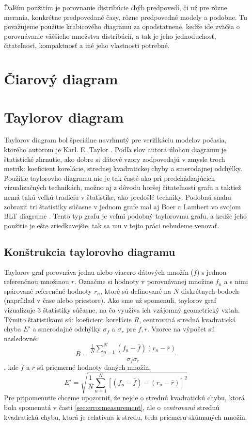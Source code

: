 Ďalším použitím je porovnanie distribúcie chýb predpovedí, či už pre rôzne merania, konkrétne predpovedané časy, rôzne predpovedné modely a podobne. Tu považujeme použitie krabicového diagramu za opodstatnené, keďže ide zväčša o porovnávanie väčšieho množstva distribúcií, a tak je jeho jednoduchosť, čitateľnosť, kompaktnosť a iné jeho vlastnosti potrebné.

\section{Čiarový diagram}

\section{Taylorov diagram}
Taylorov diagram bol špeciálne navrhnutý pre verifikáciu modelov počasia, ktorého autorom je Karl. E. Taylor \cite{Taylor}. Podľa slov autora úlohou diagramu je štatistické zhrnutie, ako dobre si dátové vzory zodpovedajú v zmysle troch metrík: koeficient korelácie, strednej kvadratickej chyby a smerodajnej odchýlky. Použitie taylorovho diagramu nie je tak časté ako pri predchádzajúcich vizualizačných technikách, možno aj z dôvodu horšej čitateľnosti grafu a taktiež nemá takú veľkú tradíciu v štatistike, ako predošlé techniky. Podobnú snahu zobraziť tri štatistiky súčasne v jednom grafe mal aj Boer a Lambert vo svojom BLT diagrame \cite{Boer}. Tento typ grafu je veľmi podobný taylorovmu grafu, a keďže jeho použitie je ešte zriedkavejšie, tak sa mu v tejto práci nebudeme venovať.
  
\subsection{Konštrukcia taylorovho diagramu}
Taylorov graf porovnáva jednu alebo viacero dátových množín ($ f $) s jednou referenčnou množinou $ r $. Označme si hodnoty v porovnávanej množine $ f_{n} $ a s nimi spárované referenčné hodnoty $ r_{n} $, ktoré sú definované na $ N $ diskrétnych bodoch (napríklad v čase alebo priestore). Ako sme už spomenuli, taylorov graf vizualizuje 3 štatistiky súčasne, na čo využíva ich vzájomný geometrický vzťah. Týmito štatistikami sú: koeficient korelácie $ R $, centrovaná stredná kvadratická chyba $ E' $ a smerodajné odchýlky $ \sigma_{f} $ a $ \sigma_{r} $ pre $ f, r $.  Vzorce na výpočet sú nasledovné:
\[
	R = \dfrac{\frac{1}{N} \sum_{n=1}^{N}(f_{n} - \bar{f})(r_{n} - \bar{r})  }{\sigma_{f}\sigma_{r}}
\]
, kde $ \bar{f} $ a $ \bar{r} $ sú priemerné hodnoty daných množín.
\[
	E' = \sqrt{\frac{1}{N} \sum_{n=1}^{N}[(f_{n} - \bar{f}) - (r_{n} - \bar{r})]^2 }
\]
Pre pripomenutie chceme upozorniť, že nejde o strednú kvadratickú chybu, ktorá bola spomenutá v časti \ref{sec:errormeasurement}, ale o \textit{centrovanú} strednú kvadratickú chybu, ktorá je relatívna k stredu, teda priemeru skúmaných množín.

